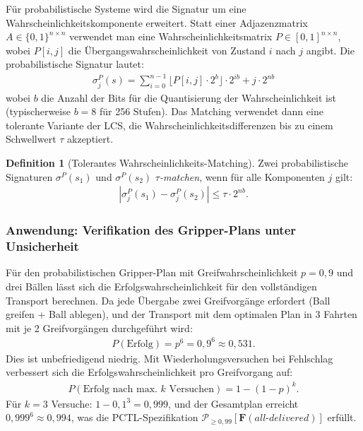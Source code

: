 ﻿\documentclass[a4paper,12pt]{article}
\theoremstyle{definition}
\newtheorem{definition}{Definition}[section]
\begin{document}
Für probabilistische Systeme wird die Signatur um eine Wahrscheinlichkeitskomponente erweitert. Statt einer Adjazenzmatrix $A \in \{0,1\}^{n \times n}$ verwendet man eine Wahrscheinlichkeitsmatrix $P \in [0,1]^{n \times n}$, wobei $P[i,j]$ die Übergangswahrscheinlichkeit von Zustand $i$ nach $j$ angibt. Die probabilistische Signatur lautet:
\begin{align}
  \sigma_j^P(s) = \sum_{i=0}^{n-1} \lfloor P[i,j] \cdot 2^b \rfloor \cdot 2^{ib} + j \cdot 2^{nb}
\end{align}
wobei $b$ die Anzahl der Bits für die Quantisierung der Wahrscheinlichkeit ist (typischerweise $b = 8$ für 256 Stufen). Das Matching verwendet dann eine tolerante Variante der LCS, die Wahrscheinlichkeitsdifferenzen bis zu einem Schwellwert $\tau$ akzeptiert.

\begin{definition}[Tolerantes Wahrscheinlichkeits-Matching]
Zwei probabilistische Signaturen $\sigma^P(s_1)$ und $\sigma^P(s_2)$ \emph{$\tau$-matchen}, wenn für alle Komponenten $j$ gilt:
\begin{align}
  |\sigma_j^P(s_1) - \sigma_j^P(s_2)| \leq \tau \cdot 2^{nb}.
\end{align}
\end{definition}

\subsubsection{Anwendung: Verifikation des Gripper-Plans unter Unsicherheit}

Für den probabilistischen Gripper-Plan mit Greifwahrscheinlichkeit $p = 0{,}9$ und drei Bällen lässt sich die Erfolgswahrscheinlichkeit für den vollständigen Transport berechnen. Da jede Übergabe zwei Greifvorgänge erfordert (Ball greifen + Ball ablegen), und der Transport mit dem optimalen Plan in 3 Fahrten mit je 2 Greifvorgängen durchgeführt wird:
\begin{align}
  P(\text{Erfolg}) = p^6 = 0{,}9^6 \approx 0{,}531.
\end{align}
Dies ist unbefriedigend niedrig. Mit Wiederholungsversuchen bei Fehlschlag verbessert sich die Erfolgswahrscheinlichkeit pro Greifvorgang auf:
\begin{align}
  P(\text{Erfolg nach max.\ $k$ Versuchen}) = 1 - (1-p)^k.
\end{align}
Für $k = 3$ Versuche: $1 - 0{,}1^3 = 0{,}999$, und der Gesamtplan erreicht $0{,}999^6 \approx 0{,}994$, was die PCTL-Spezifikation $\mathcal{P}_{\geq 0{,}99}[\mathbf{F}(\mathit{all\text{-}delivered})]$ erfüllt.
\end{document}
